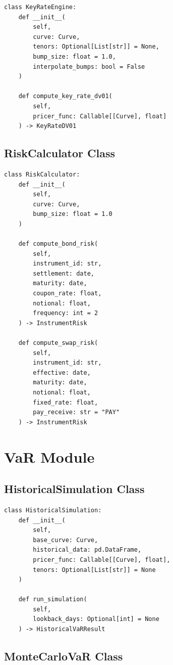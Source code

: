 \documentclass[12pt,a4paper]{report}
\begin{document}
\begin{lstlisting}
class KeyRateEngine:
    def __init__(
        self,
        curve: Curve,
        tenors: Optional[List[str]] = None,
        bump_size: float = 1.0,
        interpolate_bumps: bool = False
    )
    
    def compute_key_rate_dv01(
        self,
        pricer_func: Callable[[Curve], float]
    ) -> KeyRateDV01
\end{lstlisting}

\subsection{RiskCalculator Class}

\begin{lstlisting}
class RiskCalculator:
    def __init__(
        self,
        curve: Curve,
        bump_size: float = 1.0
    )
    
    def compute_bond_risk(
        self,
        instrument_id: str,
        settlement: date,
        maturity: date,
        coupon_rate: float,
        notional: float,
        frequency: int = 2
    ) -> InstrumentRisk
    
    def compute_swap_risk(
        self,
        instrument_id: str,
        effective: date,
        maturity: date,
        notional: float,
        fixed_rate: float,
        pay_receive: str = "PAY"
    ) -> InstrumentRisk
\end{lstlisting}

\section{VaR Module}

\subsection{HistoricalSimulation Class}

\begin{lstlisting}
class HistoricalSimulation:
    def __init__(
        self,
        base_curve: Curve,
        historical_data: pd.DataFrame,
        pricer_func: Callable[[Curve], float],
        tenors: Optional[List[str]] = None
    )
    
    def run_simulation(
        self,
        lookback_days: Optional[int] = None
    ) -> HistoricalVaRResult
\end{lstlisting}

\subsection{MonteCarloVaR Class}
\end{document}
